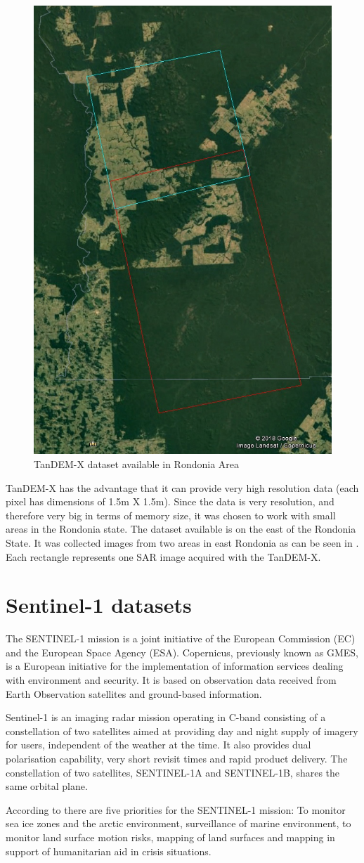 \begin{figure}[H]
    \centering
    \includegraphics[width=0.6\linewidth]{Chapter2-real/tandem_dataset.jpg}
    \caption{TanDEM-X dataset available in Rondonia Area}
    \label{fig:tandem_dataset}
\end{figure}{}
TanDEM-X has the advantage that it can provide very high resolution data (each pixel has dimensions of  1.5m X 1.5m). Since the data is very resolution, and therefore very big in terms of memory size, it was chosen to work with small areas in the Rondonia state.
The dataset available is on the east of the Rondonia State. It was collected images from two areas in east Rondonia as can be seen in . Each rectangle represents one SAR image acquired with the TanDEM-X.

\section{Sentinel-1 datasets}
\par
The SENTINEL-1 mission is a joint initiative of the European Commission (EC) and the European Space Agency (ESA). Copernicus, previously known as GMES, is a European initiative for the implementation of information services dealing with environment and security. It is based on observation data received from Earth Observation satellites and ground-based information.

Sentinel-1 is an imaging radar mission operating in C-band consisting of a constellation of two satellites aimed at providing day and night supply of imagery for users, independent of the weather at the time.
It also provides dual polarisation capability, very short revisit times and rapid product delivery. 
The constellation of two satellites, SENTINEL-1A and SENTINEL-1B, shares the same orbital plane.
\par
According to \cite{sentinelmission} there are five priorities for the SENTINEL-1 mission: To monitor sea ice zones and the arctic environment, surveillance of marine environment, to monitor land surface motion risks, mapping of land surfaces and mapping in support of humanitarian aid in crisis situations.

